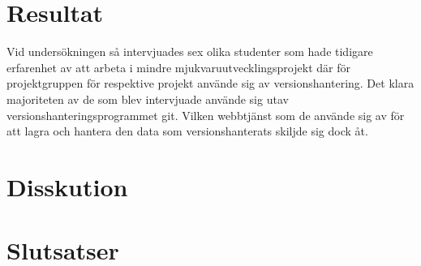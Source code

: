 \vspace{1.5em}
\section{Resultat}
Vid undersökningen så intervjuades sex olika studenter som hade tidigare erfarenhet av att arbeta i mindre mjukvaruutvecklingsprojekt där för projektgruppen för respektive projekt använde sig av versionshantering. Det klara majoriteten av de som blev intervjuade använde sig utav versionshanteringsprogrammet git. Vilken webbtjänst som de använde sig av för att lagra och hantera den data som versionshanterats skiljde sig dock åt. 

\vspace{1.5em}
\section{Disskution}


\vspace{1.5em}
\section{Slutsatser}

